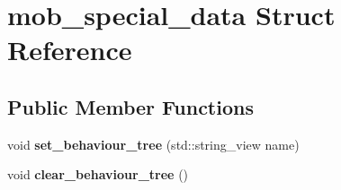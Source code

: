 \hypertarget{structmob__special__data}{}\section{mob\+\_\+special\+\_\+data Struct Reference}
\label{structmob__special__data}
\subsection*{Public Member Functions}
\begin{DoxyCompactItemize}
\item 
\mbox{\label{structmob__special__data_a2901b1eab8bd698b96d4c14f3994d027}} 
void {\bfseries set\+\_\+behaviour\+\_\+tree} (std\+::string\+\_\+view name)
\item 
\mbox{\label{structmob__special__data_ae42cd0336c74955d0b233794bf8ce4cc}} 
void {\bfseries clear\+\_\+behaviour\+\_\+tree} ()
\end{DoxyCompactItemize}
